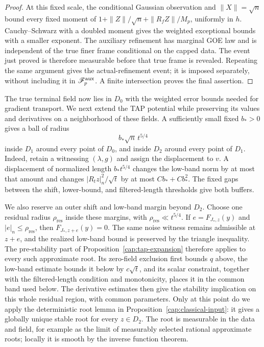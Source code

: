 \begin{proof}
At this fixed scale, the conditional Gaussian observation and
$\|X\|=\sqrt n$ bound every fixed moment of
$1+\|Z\|/\sqrt n+\|R_fZ\|/M_p$, uniformly in $h$. Cauchy--Schwarz
with a doubled moment gives the weighted exceptional bounds with a
smaller exponent. The auxiliary refinement has marginal GOE law and is
independent of the true finer frame conditional on the capped data.
The event just proved is therefore measurable before that true frame is
revealed. Repeating the same argument gives the actual-refinement event;
it is imposed separately, without including it in
$\mathscr F_p^{\rm aux}$. A finite intersection proves the final assertion.
\end{proof}

The true terminal field now lies in $D_0$ with the weighted error bounds
needed for gradient transport. We next extend the TAP potential while
preserving its values and derivatives on a neighborhood of these fields.
A sufficiently small fixed $b_*>0$ gives a ball of radius
\begin{equation}\label{cap:agreement-buffer}
 b_*\sqrt n\,t^{5/4}
\end{equation}
inside $D_1$ around every point of $D_0$, and inside $D_2$ around every point
of $D_1$. Indeed, retain a witnessing $(\lambda,g)$ and assign the
displacement to $v$. A displacement of normalized length $b_*t^{5/4}$
changes the low-band norm by at most that amount and changes
$|R_tz|_n^2/\sqrt t$ by at most $Cb_*+Cb_*^2$. The fixed gaps between the
shift, lower-bound, and filtered-length thresholds give both buffers.

We also reserve an outer shift and low-band margin beyond $D_2$. Choose one
residual radius $\rho_{\mathrm{res}}$ inside these margins, with
$\rho_{\mathrm{res}}\ll t^{5/4}$. If
$e=F_{J_*,z}(y)$ and $|e|_n\le\rho_{\mathrm{res}}$, then
$F_{J_*,z+e}(y)=0$. The same noise witness remains admissible at $z+e$,
and the realized low-band bound is preserved by the triangle inequality.
The pre-stability part of Proposition~\ref{cap:tap-expansion} therefore
applies to every such approximate root. Its zero-field exclusion first
bounds $q$ above, the low-band estimate bounds it below by $c\sqrt t$,
and its scalar constraint, together with the filtered-length condition and
monotonicity, places it in the common band used below.
The derivative estimates then give the stability implication on this
whole residual region, with common parameters. Only at this point do we
apply the deterministic root lemma in Proposition~\ref{cap:classical-input}:
it gives a globally unique stable root for every $z\in D_2$.
The root is measurable in the data and field, for example as the limit of
measurably selected rational approximate roots; locally it is smooth by
the inverse function theorem.

